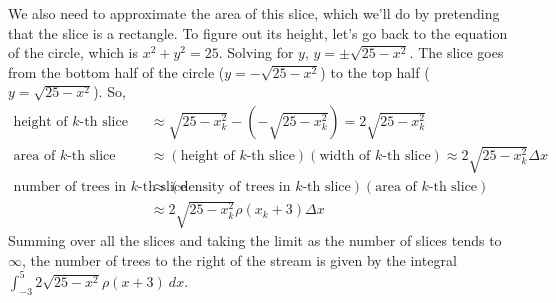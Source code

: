 \documentclass[main]{subfiles}
\begin{document}
\begin{enumerate}
\begin{solution}
    We also need to approximate the area of this slice, which we'll do by
    pretending that the slice is a rectangle.  To figure out its height,
    let's go back to the equation of the circle, which is $x^2 + y^2 =
    25$.  Solving for $y$, $y = \pm \sqrt{25 - x^2}$.  The slice goes from
    the bottom half of the circle ($y = -\sqrt{25 - x^2}$) to the top half
    ($y = \sqrt{25 - x^2}$).  So,
    \begin{align*}
      \textrm{height of $k$-th slice} & \approx \sqrt{25 - x_k^2} -
      \left(- \sqrt{25 - x_k^2} \right) = 2 \sqrt{25 - x_k^2} \\
      \textrm{area of $k$-th slice} & \approx (\textrm{height of $k$-th
        slice}) (\textrm{width of $k$-th slice}) \approx 2 \sqrt{25 -
        x_k^2} \Delta x \\
      \textrm{number of trees in $k$-th slice} & \approx
      (\textrm{density of trees in $k$-th slice}) (\textrm{area of
        $k$-th slice}) \\
      & \approx 2 \sqrt{25 - x_k^2} \rho(x_k + 3) \Delta x 
    \end{align*}
    Summing over all the slices and taking the limit as the number of
    slices tends to $\infty$, the number of trees to the right of the
    stream is given by the integral $\boxed{\int_{-3}^5 2 \sqrt{25
        - x^2} \rho(x + 3)~dx}$.
  \end{solution}
  
\end{enumerate}
\end{document}

